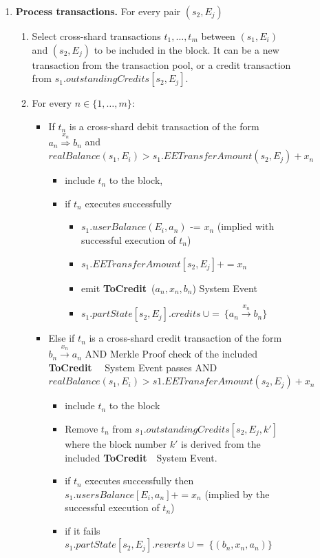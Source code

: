 \documentclass{IEEEtran}
\newcommand{\tocredit}[0]{{\bf ToCredit}~}
\begin{document}
\begin{figure}[h]
{\begin{minipage}{\textwidth}
\begin{enumerate}
\item {\bf Process transactions.} For every pair $(s_2,E_j)$
    \begin{enumerate}
	\item Select cross-shard transactions $t_1,\ldots,t_m$ between $(s_1,E_i)$ and $(s_2,E_j)$ to be included in the block. It can be a new transaction from the transaction pool, or a credit transaction from $s_1.outstandingCredits[s_2,E_j]$. 
	
	\item For every $n \in \{1, \ldots, m\}$: 
		\begin{itemize}
		\item If $t_n$ is a cross-shard debit transaction of the form $a_n \stackrel{x_n}{\Longrightarrow} b_n$ and $realBalance(s_1,E_i) > s_1.EETransferAmount(s_2,E_j) + x_n$
		\begin{itemize}
			\item include $t_n$ to the block,
			\item if $t_n$ executes successfully 
			\begin{itemize}
				\item $s_1.userBalance(E_i,a_n)$ -= $x_n$ (implied with successful execution of $t_n$)
				\item $s_1.EETransferAmount[s_2,E_j] += x_n$
				\item emit \tocredit($a_n, x_n, b_n$) System Event
				\item $s_1.partState[s_2,E_j].credits ~ \cup= ~ \{a_n \stackrel{x_n}{\longrightarrow} b_n\}$
			\end{itemize}
		\end{itemize}
		\item Else if $t_n$ is a cross-shard credit transaction of the form $b_n \stackrel{x_n}{\longrightarrow} a_n$ AND Merkle Proof check of the included \tocredit~ System Event passes AND $realBalance(s_1,E_i) > s1.EETransferAmount(s_2,E_j) + x_n$
		\begin{itemize}
			\item include $t_n$ to the block
			\item Remove $t_n$ from $s_1.outstandingCredits[s_2,E_j,k']$ where the block number $k'$ is derived from the included \tocredit ~System Event.
			\item if $t_n$ executes successfully then $s_1.usersBalance[E_i,a_n] += x_n$ (implied by the successful execution of $t_n$)
			\item if it fails \\
			$s_1.partState[s_2,E_j].reverts ~\cup=~ \{(b_n,x_n,a_n)\}$\\

\end{itemize}
\end{itemize}
\end{enumerate}
\end{enumerate}
\end{minipage}}
\end{figure}
\end{document}

